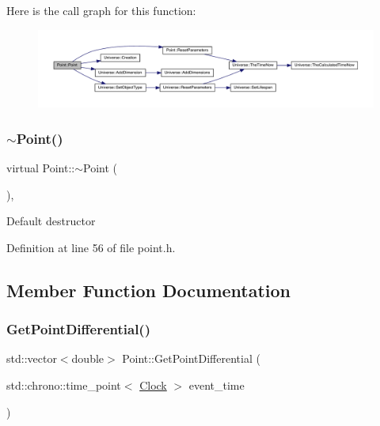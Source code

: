 Here is the call graph for this function\+:
\nopagebreak
\begin{figure}[H]
\begin{center}
\leavevmode
\includegraphics[width=350pt]{class_point_abbc76ed1b437c982eb607ec165ecfa47_cgraph}
\end{center}
\end{figure}
\mbox{\label{class_point_a364091762d6aa1aa5983d36fd7d8b6d5}} 
\subsubsection{\texorpdfstring{$\sim$\+Point()}{~Point()}}
{\footnotesize\ttfamily virtual Point\+::$\sim$\+Point (\begin{DoxyParamCaption}{ }\end{DoxyParamCaption})\hspace{0.3cm}{\ttfamily [inline]}, {\ttfamily [virtual]}}

Default destructor 

Definition at line 56 of file point.\+h.



\subsection{Member Function Documentation}
\mbox{\label{class_point_af3941d62b39234e468e201f25a37d9da}} 
\subsubsection{\texorpdfstring{Get\+Point\+Differential()}{GetPointDifferential()}}
{\footnotesize\ttfamily std\+::vector$<$double$>$ Point\+::\+Get\+Point\+Differential (\begin{DoxyParamCaption}\item[{std\+::chrono\+::time\+\_\+point$<$ \hyperlink{universe_8h_a0ef8d951d1ca5ab3cfaf7ab4c7a6fd80}{Clock} $>$}]{event\+\_\+time }\end{DoxyParamCaption})\hspace{0.3cm}{\ttfamily [inline]}}



